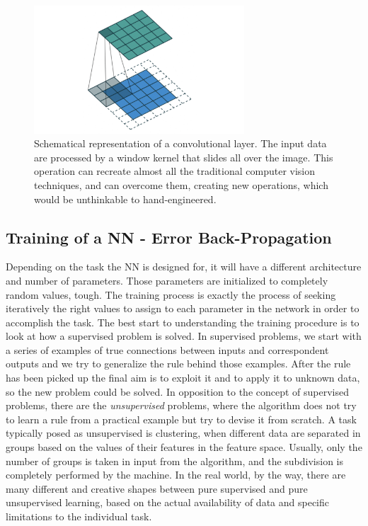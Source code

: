 \documentclass[12pt,a4paper]{report}
\begin{document}
\begin{figure}
    \centering
    \includegraphics[width = 0.7\textwidth]{images/CL}
    \caption{Schematical representation of a convolutional layer. The input data are processed by a window kernel that slides all over the image. This operation can recreate almost all the traditional computer vision techniques, and can overcome them, creating new operations, which would be unthinkable to hand-engineered.}
    \label{fig:convolutional}
\end{figure}

\subsection{Training of a NN -  Error Back-Propagation}
Depending on the task the NN is designed for, it will have a different architecture and number of parameters. Those parameters are initialized to completely random values, tough. The training process is exactly the process of seeking iteratively the right values to assign to each parameter in the network in order to accomplish the task. The best start to understanding the training procedure is to look at how a supervised problem is solved. In supervised problems, we start with a series of examples of true connections between inputs and correspondent outputs and we try to generalize the rule behind those examples. After the rule has been picked up the final aim is to exploit it and to apply it to unknown data, so the new problem could be solved. In opposition to the concept of supervised problems, there are the \textit{unsupervised} problems, where the algorithm does not try to learn a rule from a practical example but try to devise it from scratch. A task typically posed as unsupervised is clustering, when different data are separated in groups based on the values of their features in the feature space. Usually, only the number of groups is taken in input from the algorithm, and the subdivision is completely performed by the machine. In the real world, by the way, there are many different and creative shapes between pure supervised and pure unsupervised learning, based on the actual availability of data and specific limitations to the individual task.
\end{document}
